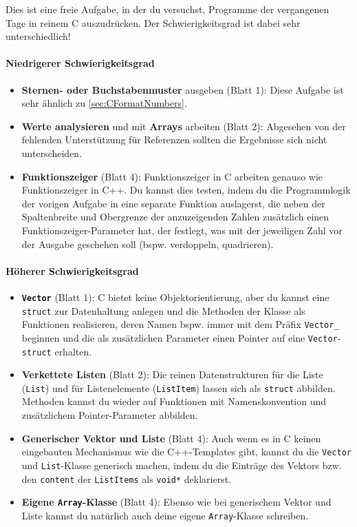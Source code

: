 \optionaltextbox

Dies ist eine freie Aufgabe, in der du versuchst, Programme der vergangenen Tage in reinem C auszudrücken.
Der Schwierigkeitsgrad ist dabei sehr unterschiedlich!

\paragraph{Niedrigerer Schwierigkeitsgrad}
\begin{itemize}
\item
\textbf{Sternen- oder Buchstabenmuster} ausgeben (Blatt 1):
Diese Aufgabe ist sehr ähnlich zu \cref{sec:CFormatNumbers}.

\item
\textbf{Werte analysieren} und mit \textbf{Arrays} arbeiten (Blatt 2):
Abgesehen von der fehlenden Unterstützung für Referenzen sollten die Ergebnisse sich nicht unterscheiden.

\item
\textbf{Funktionszeiger} (Blatt 4):
Funktionszeiger in C arbeiten genauso wie Funktionszeiger in C++.
Du kannst dies testen, indem du die Programmlogik der vorigen Aufgabe in eine separate Funktion auslagerst, die neben der Spaltenbreite und Obergrenze der anzuzeigenden Zahlen zusätzlich einen Funktionszeiger-Parameter hat, der festlegt, was mit der jeweiligen Zahl vor der Ausgabe geschehen soll (bspw. verdoppeln, quadrieren).
\end{itemize}
\paragraph{Höherer Schwierigkeitsgrad}
\begin{itemize}
\item
\textbf{\lstinline|Vector|} (Blatt 1): C bietet keine Objektorientierung, aber du kannst eine \lstinline|struct| zur Datenhaltung anlegen und die Methoden der Klasse als Funktionen realisieren, deren Namen bspw. immer mit dem Präfix \lstinline|Vector_| beginnen und die als zusätzlichen Parameter einen Pointer auf eine \lstinline|Vector|-\lstinline|struct| erhalten.

\item 
\textbf{Verkettete Listen} (Blatt 2):
Die reinen Datenstrukturen für die Liste (\lstinline|List|) und für Listenelemente (\lstinline|ListItem|) lassen sich als \lstinline|struct| abbilden.
Methoden kannst du wieder auf Funktionen mit Namenskonvention und zusätzlichem Pointer-Parameter abbilden.

\item
\textbf{Generischer Vektor und Liste} (Blatt 4):
Auch wenn es in C keinen eingebauten Mechanismus wie die C++-Templates gibt, kannst du die \lstinline|Vector| und \lstinline|List|-Klasse generisch machen, indem du die Einträge des Vektors bzw. den \lstinline|content| der \lstinline|ListItems| als \lstinline|void*| deklarierst.

\item
\textbf{Eigene \lstinline|Array|-Klasse} (Blatt 4):
Ebenso wie bei generischem Vektor und Liste kannst du natürlich auch deine eigene \lstinline|Array|-Klasse schreiben.
\end{itemize}
